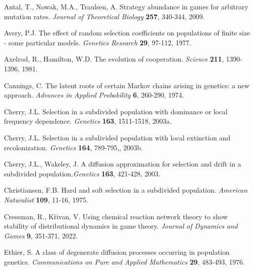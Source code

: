 \documentclass[11pt]{article}
\begin{document}




\begin{thebibliography}{99}

Antal, T., Nowak, M.A., Traulsen, A. Strategy abundance in games for arbitrary mutation rates.  {\it Journal of Theoretical Biology} {\bf 257}, 340-344, 2009.




Avery, P.J. The effect of random selection coefficients on populations of finite size - some particular models.  {\it Genetics Research} {\bf 29}, 97-112, 1977.

Axelrod, R., Hamilton, W.D. The evolution of cooperation.  {\it Science} {\bf 211}, 1390-1396, 1981.

Cannings, C. The latent roots of certain Markov chains arising in genetics: a new approach.  {\it Advances in Applied Probability} {\bf 6}, 260-290, 1974.

Cherry, J.L. Selection in a subdivided population with dominance or local frequency dependence.  {\it Genetics} {\bf 163}, 1511-1518, 2003a.

Cherry, J.L.  Selection in a subdivided population with local extinction and recolonization. {\it Genetics} {\bf 164}, 789-795,, 2003b.

 
Cherry, J.L., Wakeley, J. A diffusion approximation for selection and drift in a subdivided population.{\it Genetics} {\bf 163}, 421-428, 2003.

Christiansen, F.B. Hard and soft selection in a subdivided population.  {\it American Naturalist} {\bf 109}, 11-16, 1975.

Cressman, R., K\u{r}ivan, V. Using chemical reaction network theory to show stability of distributional dynamics in game theory. {\it Journal of Dynamics and Games} {\bf 9}, 351-371, 2022.


Ethier, S. A class of degenerate diffusion processes occurring in population genetics. {\it Communications on Pure and Applied Mathematics} {\bf 29}, 483-493, 1976.


\end{thebibliography}
\end{document}
